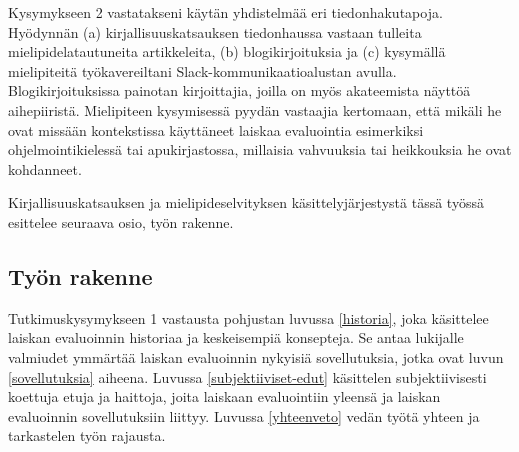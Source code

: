 \begin{sloppypar}
Kysymykseen 2 vastatakseni käytän yhdistelmää eri tiedonhakutapoja. Hyödynnän (a) kirjallisuuskatsauksen tiedonhaussa vastaan tulleita mielipidelatautuneita artikkeleita, (b) blogikirjoituksia ja (c) kysymällä mielipiteitä työkavereiltani Slack-kommunikaatioalustan avulla. Blogikirjoituksissa painotan kirjoittajia, joilla on myös akateemista näyttöä aihepiiristä. Mielipiteen kysymisessä pyydän vastaajia kertomaan, että mikäli he ovat missään kontekstissa käyttäneet laiskaa evaluointia esimerkiksi ohjelmointikielessä tai apukirjastossa, millaisia vahvuuksia tai heikkouksia he ovat kohdanneet.
\end{sloppypar}

Kirjallisuuskatsauksen ja mielipideselvityksen käsittelyjärjestystä tässä työssä esittelee seuraava osio, työn rakenne.

\subsection{Työn rakenne}

Tutkimuskysymykseen 1 vastausta pohjustan luvussa \ref{historia}, joka käsittelee laiskan evaluoinnin historiaa ja keskeisempiä konsepteja. Se antaa lukijalle valmiudet ymmärtää laiskan evaluoinnin nykyisiä sovellutuksia, jotka ovat luvun \ref{sovellutuksia} aiheena. Luvussa \ref{subjektiiviset-edut} käsittelen subjektiivisesti koettuja etuja ja haittoja, joita laiskaan evaluointiin yleensä ja laiskan evaluoinnin sovellutuksiin liittyy. Luvussa \ref{yhteenveto} vedän työtä yhteen ja tarkastelen työn rajausta.
